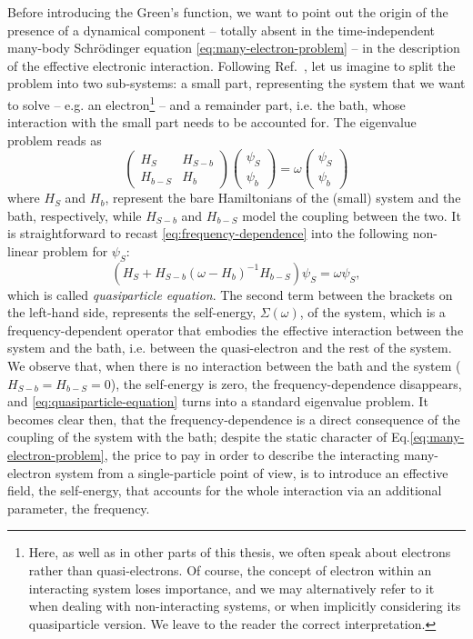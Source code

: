 Before introducing the Green's function, we want to point out the origin of the presence of a dynamical component -- totally absent in the time-independent many-body Schr\"{o}dinger equation \eqref{eq:many-electron-problem} -- in the description of the effective electronic interaction. Following Ref.~\cite{martin_interacting_2016}, let us imagine to split the problem into two sub-systems: a small part, representing the system that we want to solve -- e.g. an electron\footnote{Here, as well as in other parts of this thesis, we often speak about electrons rather than quasi-electrons. Of course, the concept of electron within an interacting system loses importance, and we may alternatively refer to it when dealing with non-interacting systems, or when implicitly considering its quasiparticle version. We leave to the reader the correct interpretation.} -- and a remainder part, i.e. the bath, whose interaction with the small part needs to be accounted for. The eigenvalue problem reads as
%
\begin{equation}
    \begin{pmatrix}
        H_S & H_{S-b} \\
        H_{b-S} & H_b
    \end{pmatrix}
    \begin{pmatrix}
        \psi_S \\
        \psi_b
    \end{pmatrix} =
    \omega
    \begin{pmatrix}
        \psi_S \\
        \psi_b
    \end{pmatrix}
    \label{eq:frequency-dependence}
\end{equation}
%
where $H_S$ and $H_b$, represent the bare Hamiltonians of the (small) system and the bath, respectively, while $H_{S-b}$ and $H_{b-S}$ model the coupling between the two. It is straightforward to recast \cref{eq:frequency-dependence} into the following non-linear problem for $\psi_S$:
%
\begin{equation}
    \left( H_S + H_{S-b}(\omega - H_b)^{-1}H_{b-S} \right) \psi_S = \omega \psi_S ,
    \label{eq:quasiparticle-equation}
\end{equation}
%
which is called \emph{quasiparticle equation}. The second term between the brackets on the left-hand side, represents the self-energy, $\Sigma(\omega)$, of the system, which is a frequency-dependent operator that embodies the effective interaction between the system and the bath, i.e. between the quasi-electron and the rest of the system. We observe that, when there is no interaction between the bath and the system ($H_{S-b} = H_{b-S} = 0$), the self-energy is zero, the frequency-dependence disappears, and \cref{eq:quasiparticle-equation} turns into a standard eigenvalue problem. It becomes clear then, that the frequency-dependence is a direct consequence of the coupling of the system with the bath; despite the static character of Eq.\eqref{eq:many-electron-problem}, the price to pay in order to describe the interacting many-electron system from a single-particle point of view, is to introduce an effective field, the self-energy, that accounts for the whole interaction via an additional parameter, the frequency.

